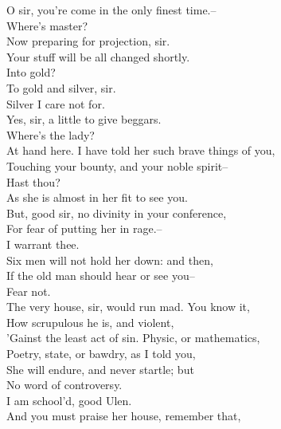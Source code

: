 \documentclass{memoir}
\begin{document}
\begin{drama*}
\facespeaks  O sir, you're come in the only finest time.--\\
\mammonspeaks  Where's master?\\
\facespeaks {} Now preparing for projection, sir.\\
 Your stuff will be all changed shortly.\\
\mammonspeaks {} Into gold?\\
\facespeaks  To gold and silver, sir.\\
\mammonspeaks {} Silver I care not for.\\
\facespeaks  Yes, sir, a little to give beggars.\\
\mammonspeaks {} Where's the lady?\\
\facespeaks  At hand here. I have told her such brave things of you,\\
 Touching your bounty, and your noble spirit--\\
\mammonspeaks  Hast thou?\\
\facespeaks {} As she is almost in her fit to see you.\\
 But, good sir, no divinity in your conference,\\
 For fear of putting her in rage.--\\
\mammonspeaks {} I warrant thee.\\
\facespeaks Six men  will not hold her down: and then,\\
 If the old man should hear or see you--\\
\mammonspeaks {} Fear not.\\
\facespeaks  The very house, sir, would run mad. You know it,\\
 How scrupulous he is, and violent,\\
 'Gainst the least act of sin. Physic, or mathematics,\\
 Poetry, state, or bawdry, as I told you,\\
 She will endure, and never startle; but\\
 No word of controversy.\\
\mammonspeaks {} I am school'd, good Ulen.\\
\facespeaks  And you must praise her house, remember that,\\

\end{drama*}
\end{document}
